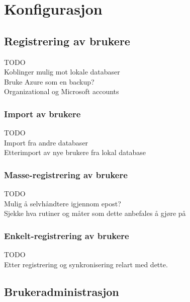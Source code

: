 \chapter{Konfigurasjon}
\label{chap:konfigurasjon}

\section{Registrering av brukere}
\label{sec:konfigurasjon_registreringAvBrukere}
{\color{red}TODO} \\
Koblinger mulig mot lokale databaser \\
Bruke Azure som en backup?\\
Organizational og Microsoft accounts

\subsection{Import av brukere}
\label{subsec:ikonfigurasjon_registreringAvBrukere_importAvBrukere}
{\color{red}TODO} \\
Import fra andre databaser \\
Etterimport av nye brukere fra lokal database \\
 
\subsection{Masse-registrering av brukere}
\label{subsec:konfigurasjon_registreringAvBrukere_masseRegistrering}
{\color{red}TODO} \\
Mulig å selvhåndtere igjennom epost?  \\
Sjekke hva rutiner og måter som dette anbefales å gjøre på \\

\subsection{Enkelt-registrering av brukere}
\label{subsec:konfigurasjon_registreringAvBrukere_enkeltRegistrering}
{\color{red}TODO} \\
Etter registrering og synkronisering relart med dette. \\

\section{Brukeradministrasjon}
\label{sec:konfigurasjon_grupperOgRoller}

